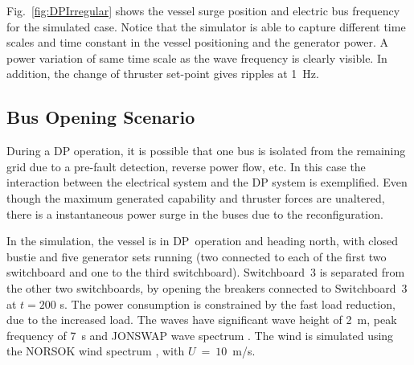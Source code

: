 \documentclass[journal]{IEEEtran}
\begin{document}
Fig.~\ref{fig:DPIrregular} shows the vessel surge position and electric bus frequency for the simulated case. Notice that the simulator is able to capture different time scales and time constant in the vessel positioning and the generator power.
A power variation of same time scale as the wave frequency is clearly visible.
In addition, the change of thruster set-point gives ripples at 1~Hz.


\subsection{Bus Opening Scenario}
\label{sec:busOpening}
During a DP operation, it is possible that one bus is isolated from the remaining grid due to a pre-fault detection, reverse power flow, etc. In this case the interaction between the electrical system and the DP system is exemplified. Even though the maximum generated capability and thruster forces are unaltered, there is a instantaneous power surge in the buses due to the reconfiguration.

In the simulation, the vessel is in DP~operation and heading north, with closed bustie and five generator sets running (two connected to each of the first two switchboard and one to the third switchboard).
Switchboard~3 is separated from the other two switchboards, by opening the breakers connected to Switchboard~3 at $t = 200$ s.
The power consumption is constrained by the fast load reduction, due to the increased load.
The waves have significant wave height of 2~m, peak frequency of 7~s and JONSWAP wave spectrum \cite{Myrhaug2000}. The wind is simulated using the NORSOK wind spectrum \cite{Sorensen2013}, with $U~=~10$~m/s.
\end{document}
